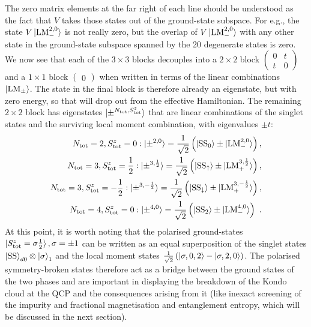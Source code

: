 The zero matrix elements at the far right of each line should be understood as the fact that \(V\) takes those states out of the ground-state subspace. For e.g., the state \(V\ket{\text{LM}_-^{2,0}}\) is not really zero, but the overlap of \(V\ket{\text{LM}_-^{2,0}}\) with any other state in the ground-state subspace spanned by the 20 degenerate states is zero. We now see that each of the \(3\times3\) blocks decouples into a \(2\times2\) block \(\begin{pmatrix} 0 & t \\ t & 0 \end{pmatrix} \)and a \(1\times1\) block \(\begin{pmatrix} 0 \end{pmatrix} \) when written in terms of the linear combinations \(\ket{\text{LM}_\pm}\). The state in the final block is therefore already an eigenstate, but with zero energy, so that will drop out from the effective Hamiltonian. The remaining \(2\times 2\) block has eigenstates \(\ket{\pm^{N_\text{tot},S_\text{tot}^z}}\) that are linear combinations of the singlet states and the surviving local moment combination, with eigenvalues \(\pm t\):
\begin{eqnarray}
	\label{new g-states}
	N_\text{tot} = 2, S_\text{tot}^z = 0: \ket{\pm^{2,0}} = \frac{1}{\sqrt 2}\left(\ket{\text{SS}_0} \pm \ket{\text{LM}_-^{2,0}}\right),\nonumber \\
	N_\text{tot} = 3, S_\text{tot}^z = \frac{1}{2}: \ket{\pm^{3,\frac{1}{2}}} = \frac{1}{\sqrt 2}\left(\ket{\text{SS}_\uparrow} \pm \ket{\text{LM}_+^{3,\frac{1}{2}}}\right),\nonumber \\
	N_\text{tot} = 3, S_\text{tot}^z = -\frac{1}{2}: \ket{\pm^{3,-\frac{1}{2}}} = \frac{1}{\sqrt 2}\left(\ket{\text{SS}_\downarrow} \pm \ket{\text{LM}_+^{3,-\frac{1}{2}}}\right), \nonumber\\
	N_\text{tot} = 4, S_\text{tot}^z = 0: \ket{\pm^{4,0}} = \frac{1}{\sqrt 2}\left(\ket{\text{SS}_2} \pm \ket{\text{LM}_-^{4,0}}\right)~.
\end{eqnarray}
At this point, it is worth noting that the polarised ground-states \(\ket{S_\text{tot}^z=\sigma\frac{1}{2}},\sigma=\pm 1\) can be written as an equal superposition of the singlet states \(\ket{\text{SS}}_{d0}\otimes\ket{\sigma}_1\) and the local moment states \(\frac{1}{\sqrt 2}\left(\ket{\sigma, 0, 2} - \ket{\sigma, 2, 0}\right)\). The polarised symmetry-broken states therefore act as a bridge between the ground states of the two phases and are important in displaying the breakdown of the Kondo cloud at the QCP and the consequences arising from it (like inexact screening of the impurity and fractional magnetisation and entanglement entropy, which will be discussed in the next section).

